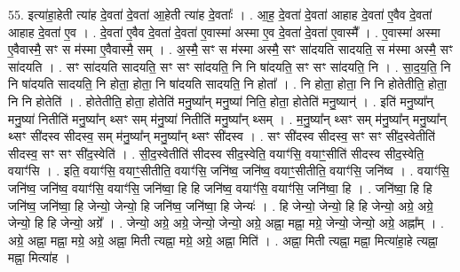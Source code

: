 \documentclass[17pt]{extarticle}
\begin{document}
55. इत्या॑हा॒हेती त्या॑ह दे॒वता॑ दे॒वता॑ आ॒हेती त्या॑ह दे॒वताः᳚ । . आ॒ह॒ दे॒वता॑ दे॒वता॑ आहाह दे॒वता॑ ए॒वैव दे॒वता॑ आहाह दे॒वता॑ ए॒व । . दे॒वता॑ ए॒वैव दे॒वता॑ दे॒वता॑ ए॒वास्मा॑ अस्मा ए॒व दे॒वता॑ दे॒वता॑ ए॒वास्मै᳚ । . ए॒वास्मा॑ अस्मा ए॒वैवास्मै॒ सꣳ स म॑स्मा ए॒वैवास्मै॒ सम् । . अ॒स्मै॒ सꣳ स म॑स्मा अस्मै॒ सꣳ सा॑दयति सादयति॒ स म॑स्मा अस्मै॒ सꣳ सा॑दयति । . सꣳ सा॑दयति सादयति॒ सꣳ सꣳ सा॑दयति॒ नि नि षा॑दयति॒ सꣳ सꣳ सा॑दयति॒ नि । . सा॒द॒य॒ति॒ नि नि षा॑दयति सादयति॒ नि होता॒ होता॒ नि षा॑दयति सादयति॒ नि होता᳚ । . नि होता॒ होता॒ नि नि होतेतीति॒ होता॒ नि नि होतेति॑ । . होतेतीति॒ होता॒ होतेति॑ मनु॒ष्या᳚न् मनु॒ष्या॑ निति॒ होता॒ होतेति॑ मनु॒ष्यान्॑ । . इति॑ मनु॒ष्या᳚न् मनु॒ष्या॑ नितीति॑ मनु॒ष्या᳚न् थ्सꣳ सम् म॑नु॒ष्या॑ नितीति॑ मनु॒ष्या᳚न् थ्सम् । . म॒नु॒ष्या᳚न् थ्सꣳ सम् म॑नु॒ष्या᳚न् मनु॒ष्या᳚न् थ्सꣳ सी॑दस्व सीदस्व॒ सम् म॑नु॒ष्या᳚न् 
मनु॒ष्या᳚न् थ्सꣳ सी॑दस्व । . सꣳ सी॑दस्व सीदस्व॒ सꣳ सꣳ सी॑द॒स्वेतीति॑ सीदस्व॒ सꣳ सꣳ सी॑द॒स्वेति॑ । . सी॒द॒स्वेतीति॑ सीदस्व सीद॒स्वेति॒ वयाꣳ॑सि॒ वयाꣳ॒॒सीति॑ सीदस्व सीद॒स्वेति॒ वयाꣳ॑सि । . इति॒ वयाꣳ॑सि॒ वयाꣳ॒॒सीतीति॒ वयाꣳ॑सि॒ जनि॑ष्व॒ जनि॑ष्व॒ वयाꣳ॒॒सीतीति॒ वयाꣳ॑सि॒ जनि॑ष्व । . वयाꣳ॑सि॒ जनि॑ष्व॒ जनि॑ष्व॒ वयाꣳ॑सि॒ वयाꣳ॑सि॒ जनि॑ष्वा॒ हि हि जनि॑ष्व॒ वयाꣳ॑सि॒ वयाꣳ॑सि॒ जनि॑ष्वा॒ हि । . जनि॑ष्वा॒ हि हि जनि॑ष्व॒ जनि॑ष्वा॒ हि जेन्यो॒ जेन्यो॒ हि जनि॑ष्व॒ जनि॑ष्वा॒ हि जेन्यः॑ । . हि जेन्यो॒ जेन्यो॒ हि हि जेन्यो॒ अग्रे॒ अग्रे॒ जेन्यो॒ हि हि जेन्यो॒ अग्रे᳚ । . जेन्यो॒ अग्रे॒ अग्रे॒ जेन्यो॒ जेन्यो॒ अग्रे॒ अह्ना॒ मह्ना॒ मग्रे॒ जेन्यो॒ जेन्यो॒ अग्रे॒ अह्ना᳚म् । . अग्रे॒ अह्ना॒ मह्ना॒ मग्रे॒ अग्रे॒ अह्ना॒ मिती त्यह्ना॒ मग्रे॒ अग्रे॒ अह्ना॒ मिति॑ । . अह्ना॒ मिती त्यह्ना॒ मह्ना॒ मित्या॑हा॒हे त्यह्ना॒ मह्ना॒ मित्या॑ह । \newline
\end{document}
